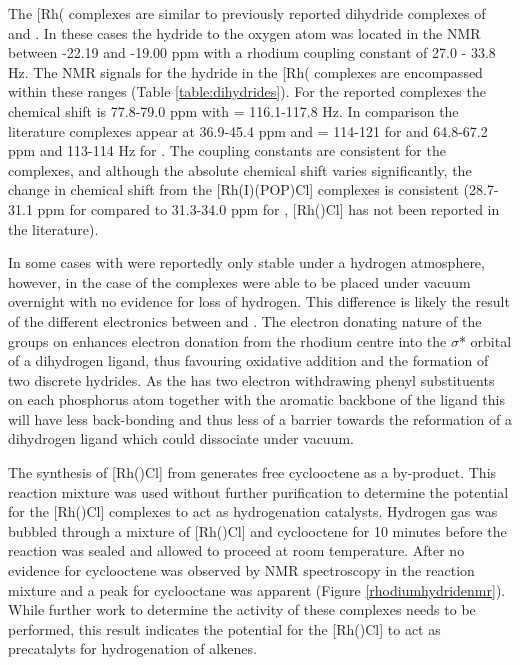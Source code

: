 The [Rh(\tBuxantphosk\ce{)(H)2Cl]} complexes are similar to previously reported dihydride complexes of \iPrxantphos{}\cite{Esteruelas2013, Esteruelas2013b} and \Phxantphos{}\cite{Dallanegra2012, Johnson2013, Pawley2010}.   In these cases the hydride \trans{} to the oxygen atom was located in the \proton{} NMR between -22.19 and -19.00 ppm with a rhodium coupling constant of 27.0 - 33.8 Hz.  The \proton{} NMR signals for the hydride in the [Rh(\tBuxantphosk\ce{)(H)2Cl]} complexes are encompassed within these ranges (Table \ref{table:dihydrides}).  For the reported \tBuxantphos{} complexes the \phosphorus{} chemical shift is 77.8-79.0 ppm with \JRhP{} = 116.1-117.8 Hz.  In comparison the literature complexes appear at 36.9-45.4 ppm and \JRhP{} = 114-121 for \Phxantphos{} and 64.8-67.2 ppm and 113-114 Hz for \iPrxantphos{}.  The coupling constants are consistent for the complexes, and although the absolute chemical shift varies significantly, the change in chemical shift from the [Rh(I)(POP)Cl] complexes is consistent (28.7-31.1 ppm for \iPrxantphos{} compared to 31.3-34.0 ppm for \tBuxantphos{}, [Rh(\Phxantphos)Cl] has not been reported in the literature).  

In some cases with \Phxantphos{}  were reportedly only stable under a hydrogen atmosphere,\cite{Johnson2013, Dallanegra2012} however, in the case of \tBuxantphos{} the complexes were able to be placed under vacuum overnight with no evidence for loss of hydrogen.  This difference is likely the result of the different electronics between \tBuxantphos{} and \Phxantphos{}.  The electron donating nature of the \tBu{} groups on \tBuxantphos{} enhances electron donation from the rhodium centre into the $\sigma$* orbital of a dihydrogen ligand, thus favouring oxidative addition and the formation of two discrete hydrides.  As the \Phxantphos{} has two electron withdrawing phenyl substituents on each phosphorus atom together with the aromatic backbone of the ligand this will have less back-bonding and thus less of a barrier towards the reformation of a dihydrogen ligand which could dissociate under vacuum.

The synthesis of [Rh(\tBuxantphosk)Cl] from  generates free cyclooctene as a by-product.  This reaction mixture was used without further purification to determine the potential for the [Rh(\tBuxantphosk)Cl] complexes to act as hydrogenation catalysts.  Hydrogen gas was bubbled through a mixture of [Rh(\tBuxantphosk)Cl] and cyclooctene for 10 minutes before the reaction was sealed and allowed to proceed at room temperature.  After  no evidence for cyclooctene was observed by \proton{} NMR spectroscopy in the reaction mixture and a peak for cyclooctane was apparent (Figure \ref{rhodiumhydridenmr}).  While further work to determine the activity of these complexes needs to be performed, this result indicates the potential for the [Rh(\tBuxantphosk)Cl] to act as precatalyts for hydrogenation of alkenes.  

